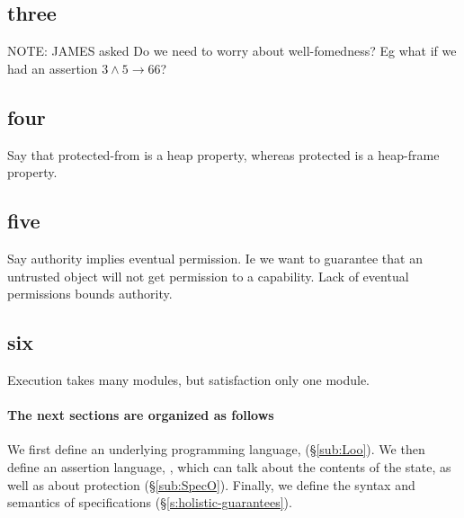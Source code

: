 \subsection{three}
NOTE: JAMES asked Do we need to worry about well-fomedness? Eg what if
we had an assertion $3 \wedge 5 \rightarrow 66$?

  

\subsection{four}
Say that protected-from is a heap property, whereas protected is a
heap-frame property.


\subsection{five}
Say authority implies eventual permission. Ie we want to guarantee that an untrusted object will not get permission to a capability. Lack of eventual permissions bounds authority.

\subsection{six}
Execution takes many modules, but satisfaction only one module.


\paragraph{The next sections are organized as follows}
\label{s:semantics}
We first define an underlying programming language, \LangOO (\S \ref{sub:Loo}).
We then define an assertion language, \AssertLang, which can talk about the
contents of the state, as well as about protection (\S \ref{sub:SpecO}).  Finally, we define the syntax and
semantics of  \SpecLang
specifications (\S \ref{s:holistic-guarantees}).

 

